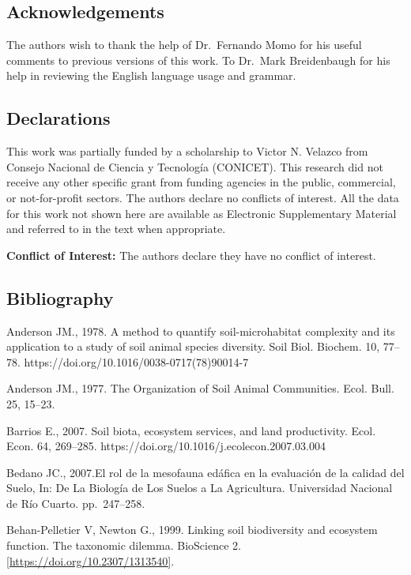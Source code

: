 \documentclass[10pt,oneside]{article}
\begin{document}
\hypertarget{acknowledgements}{%
\subsection{Acknowledgements}\label{acknowledgements}}

The authors wish to thank the help of Dr.~Fernando Momo for his useful
comments to previous versions of this work. To Dr.~Mark Breidenbaugh for
his help in reviewing the English language usage and grammar.

\hypertarget{declarations}{%
\subsection{Declarations}\label{declarations}}

This work was partially funded by a scholarship to Victor N. Velazco
from Consejo Nacional de Ciencia y Tecnología (CONICET). This research
did not receive any other specific grant from funding agencies in the
public, commercial, or not-for-profit sectors. The authors declare no
conflicts of interest. All the data for this work not shown here are
available as Electronic Supplementary Material and referred to in the
text when appropriate.

\textbf{Conflict of Interest:} The authors declare they have no conflict
of interest.

\hypertarget{bibliography}{%
\subsection{Bibliography}\label{bibliography}}

Anderson JM., 1978. A method to quantify soil-microhabitat complexity
and its application to a study of soil animal species diversity. Soil
Biol. Biochem. 10, 77--78. https://doi.org/10.1016/0038-0717(78)90014-7

Anderson JM., 1977. The Organization of Soil Animal Communities. Ecol.
Bull. 25, 15--23.

Barrios E., 2007. Soil biota, ecosystem services, and land productivity.
Ecol. Econ. 64, 269--285. https://doi.org/10.1016/j.ecolecon.2007.03.004

Bedano JC., 2007.El rol de la mesofauna edáfica en la evaluación de la
calidad del Suelo, In: De La Biología de Los Suelos a La Agricultura.
Universidad Nacional de Río Cuarto. pp.~247--258.

Behan-Pelletier V, Newton G., 1999. Linking soil biodiversity and
ecosystem function. The taxonomic dilemma. BioScience 2.
\href{https://doi.org/10.2307/1313540}{{[}https://doi.org/10.2307/1313540{]}}.
\end{document}
